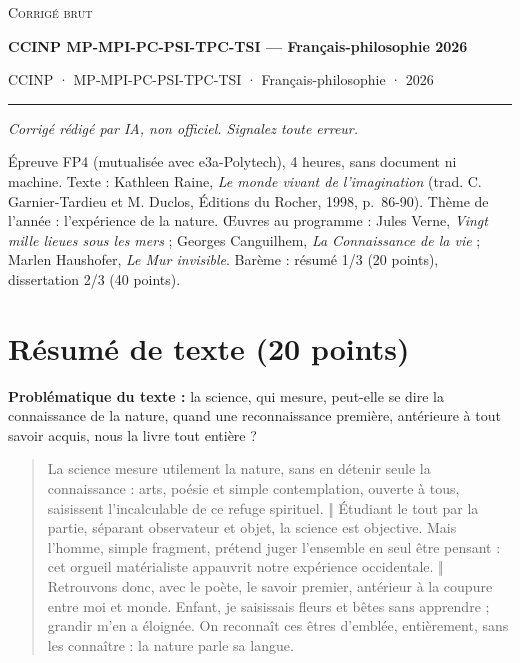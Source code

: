 \documentclass[11pt,a4paper]{article}
\begin{document}
\thispagestyle{plain}
\begin{center}
  {\small\scshape Corrigé brut}\par\smallskip
  {\LARGE\bfseries CCINP MP-MPI-PC-PSI-TPC-TSI — Français-philosophie 2026\par}\medskip
  {\large CCINP · MP-MPI-PC-PSI-TPC-TSI · Français-philosophie · 2026\par}
\end{center}
\vspace{2pt}\hrule\vspace{8pt}

\emph{Corrigé rédigé par IA, non officiel. Signalez toute erreur.}

Épreuve FP4 (mutualisée avec e3a-Polytech), 4 heures, sans document ni machine. Texte : Kathleen Raine, \emph{Le monde vivant de l'imagination} (trad. C. Garnier-Tardieu et M. Duclos, Éditions du Rocher, 1998, p.~86-90). Thème de l'année : l'expérience de la nature. Œuvres au programme : Jules Verne, \emph{Vingt mille lieues sous les mers} ; Georges Canguilhem, \emph{La Connaissance de la vie} ; Marlen Haushofer, \emph{Le Mur invisible}. Barème : résumé 1/3 (20 points), dissertation 2/3 (40 points).

\hypertarget{ruxe9sumuxe9-de-texte-20-points}{%
\section{Résumé de texte (20 points)}\label{ruxe9sumuxe9-de-texte-20-points}}

\textbf{Problématique du texte :} la science, qui mesure, peut-elle se dire la connaissance de la nature, quand une reconnaissance première, antérieure à tout savoir acquis, nous la livre tout entière ?

\begin{quote}

La science mesure utilement la nature, sans en détenir seule la connaissance : arts, poésie et simple contemplation, ouverte à tous, saisissent l'incalculable de ce refuge spirituel. ‖ Étudiant le tout par la partie, séparant observateur et objet, la science est objective. Mais l'homme, simple fragment, prétend juger l'ensemble en seul être pensant : cet orgueil matérialiste appauvrit notre expérience occidentale. ‖ Retrouvons donc, avec le poète, le savoir premier, antérieur à la coupure entre moi et monde. Enfant, je saisissais fleurs et bêtes sans apprendre ; grandir m'en a éloignée. On reconnaît ces êtres d'emblée, entièrement, sans les connaître : la nature parle sa langue.

\end{quote}
\end{document}
